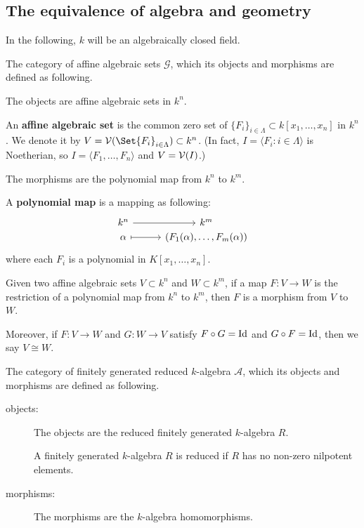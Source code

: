 \subsection{The equivalence of algebra and geometry}

In the following, $k$ will be an algebraically closed field.
\begin{definition}
  The category of affine algebraic sets $\mathcal{G}$, which its objects and morphisms are defined as following.

  \begin{description}[leftmargin=0cm]
    \item[objects:] The objects are affine algebraic sets in $k^n$.

    An {\bf affine algebraic set} is the common zero set of $\{ F_i \}_{i \in \Lambda} \subset k[x_1, \dots, x_n]$
    in $k^n$.
    We denote it by $V = \Vc(\Set{F_i}_{i \in \Lambda}) \subset k^n$.
    (In fact, $I = \langle F_i : i \in \Lambda \rangle$ is Noetherian, so
    $I = \langle F_1, \dots, F_n \rangle$ and $V = \mathcal{V}(I)$.)

    \item[morphisms:] The morphisms are the polynomial map from $k^n$ to $k^m$.

      A {\bf polynomial map} is a mapping as following:
      \[
        \begin{tikzcd}[column sep=1cm,row sep=0ex]
            k^n \arrow[r]& k^m \\
           \alpha \arrow[r, mapsto] & (F_1(\alpha), \dots, F_m(\alpha))
        \end{tikzcd}
      \]
      where each $F_i$ is a polynomial in $K[x_1, \dots, x_n]$.

      Given two affine algebraic sets $V \subset k^n$ and $W \subset k^m$, if a map $F: V \to W$ is
      the restriction of a polynomial map from $k^n$ to $k^m$, then $F$ is a morphism from $V$ to $W$.

      Moreover, if $F: V \to W$ and $G : W \to V$ satisfy $F \circ G = {\rm Id}$ and $G \circ F = {\rm Id}$,
      then we say $V \cong W$.
  \end{description}
\end{definition}

\begin{definition}
  The category of finitely generated reduced $k$-algebra $\mathcal{A}$,
  which its objects and morphisms are defined as following.

  \begin{description}
    \item[objects:] The objects are the reduced finitely generated $k$-algebra $R$.

    A finitely generated $k$-algebra $R$ is reduced if $R$ has no non-zero nilpotent elements.

    \item[morphisms:] The morphisms are the $k$-algebra homomorphisms.
  \end{description}
\end{definition}

